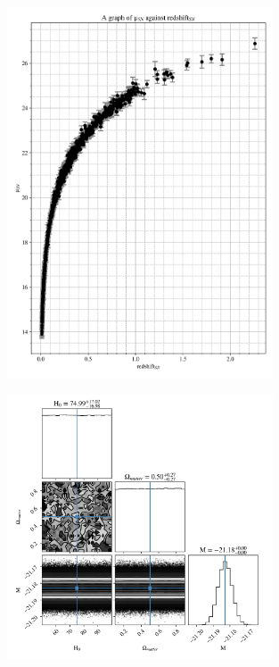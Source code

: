 \documentclass[12pt, a4paper]{article}
\begin{document}
\begin{figure}[]
    \centering
    \includegraphics[width = 0.7\textwidth]{Graph 3.png}
\end{figure}

\begin{figure}[]
    \centering
    \includegraphics[width = 0.7\textwidth]{Graph 4.png}
\end{figure}
\end{document}
